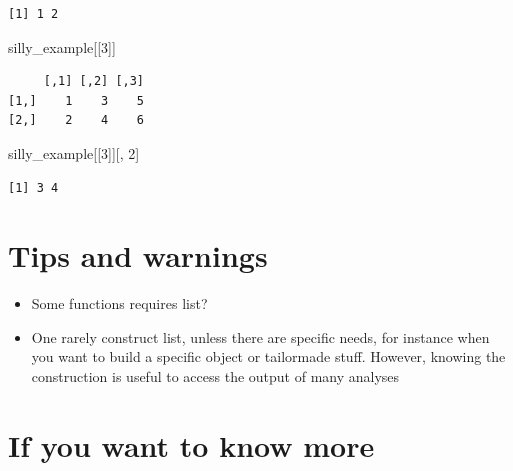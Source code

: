 \documentclass[
  letterpaper,
  DIV=11,
  numbers=noendperiod]{scrreprt}
\newenvironment{Shaded}{\begin{snugshade}}{\end{snugshade}}
\newcommand{\DecValTok}[1]{\textcolor[rgb]{0.68,0.00,0.00}{#1}}
\newcommand{\NormalTok}[1]{\textcolor[rgb]{0.00,0.23,0.31}{#1}}
\newcommand{\SpecialCharTok}[1]{\textcolor[rgb]{0.37,0.37,0.37}{#1}}
\providecommand{\tightlist}{%
  \setlength{\itemsep}{0pt}\setlength{\parskip}{0pt}}
\begin{document}
\begin{Shaded}
\end{Shaded}

\begin{verbatim}
[1] 1 2
\end{verbatim}

\begin{Shaded}
\begin{Highlighting}[]
\NormalTok{silly\_example[[}\DecValTok{3}\NormalTok{]]}
\end{Highlighting}
\end{Shaded}

\begin{verbatim}
     [,1] [,2] [,3]
[1,]    1    3    5
[2,]    2    4    6
\end{verbatim}

\begin{Shaded}
\begin{Highlighting}[]
\NormalTok{silly\_example[[}\DecValTok{3}\NormalTok{]][, }\DecValTok{2}\NormalTok{]}
\end{Highlighting}
\end{Shaded}

\begin{verbatim}
[1] 3 4
\end{verbatim}

\section*{Tips and warnings}\label{tips-and-warnings-31}


\begin{itemize}
\tightlist
\item
  Some functions requires list?
\item
  One rarely construct list, unless there are specific needs, for
  instance when you want to build a specific object or tailormade stuff.
  However, knowing the construction is useful to access the output of
  many analyses
\end{itemize}

\section*{If you want to know more}\label{if-you-want-to-know-more-3}
\end{document}
